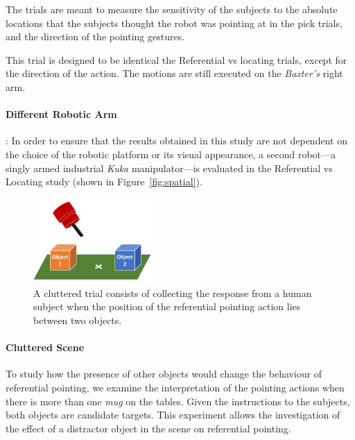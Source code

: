 The trials are meant to measure the sensitivity of the subjects to the absolute locations that the subjects thought the robot was pointing at in the pick trials, and the direction of the pointing gestures.


This trial is designed to be identical the Referential vs locating trials, except for the direction of the action. The motions are still executed on the \textit{Baxter's} right arm. 

\paragraph{Different Robotic Arm}:
In order to ensure that the results obtained in this study are not dependent on the choice of the robotic platform or its visual appearance, a second robot---a singly armed industrial \textit{Kuka} manipulator---is evaluated in the Referential vs Locating study (shown in Figure~\ref{fig:spatial}).

\begin{figure}[t]
    \centering
    \includegraphics[width=0.4\textwidth]{figures/clutter_trial.png}
    \caption{A cluttered trial consists of collecting the response from a human subject when the position of the referential pointing action lies between two objects.}
    \label{fig:cluttered_trial}
\end{figure}

\paragraph{Cluttered Scene}
To study how the presence of other objects would change the behaviour of referential pointing, we examine the interpretation of the pointing actions when there is more than one \textit{mug} on the tables. Given the instructions to the subjects, both objects are candidate targets. This experiment allows the investigation of the effect of a distractor object in the scene on referential pointing.  

